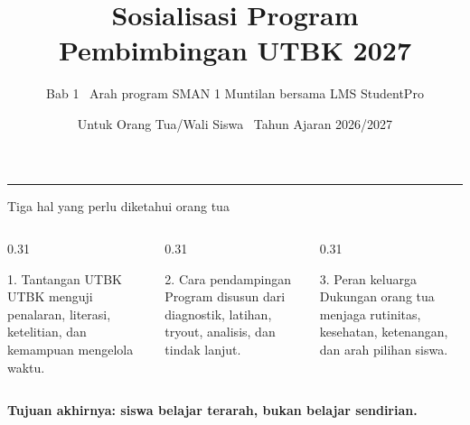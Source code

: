 \renewcommand{\currentchapter}{1}
\title{Sosialisasi Program\\Pembimbingan UTBK 2027}
\subtitle{Bab 1 \textbar\ Arah program SMAN 1 Muntilan bersama LMS StudentPro}
\date{Untuk Orang Tua/Wali Siswa \textbar\ Tahun Ajaran 2026/2027}

\begingroup
{}
\begin{frame}[plain]
  \vspace{0.65cm}
  \vspace{0.08cm}
  {\color{StudentWhite}\inserttitle\par}
  \vspace{0.38cm}
  {\color{StudentSoft}\insertsubtitle\par}
  \vfill
  {\color{StudentGold}\rule{2.3cm}{2.5pt}}\par
  \vspace{0.20cm}
  {\color{StudentWhite}\insertauthor}\par
  {\color{StudentSoft}\insertdate}
  \vspace{0.42cm}
\end{frame}
\endgroup

\begin{frame}{Tiga hal yang perlu diketahui orang tua}
  \vspace{0.05cm}
  \begin{columns}[T,onlytextwidth]
    \begin{column}{0.31\textwidth}
      \begin{block}{1. Tantangan UTBK}
        UTBK menguji penalaran, literasi, ketelitian, dan kemampuan mengelola waktu.
      \end{block}
    \end{column}
    \begin{column}{0.31\textwidth}
      \begin{block}{2. Cara pendampingan}
        Program disusun dari diagnostik, latihan, tryout, analisis, dan tindak lanjut.
      \end{block}
    \end{column}
    \begin{column}{0.31\textwidth}
      \begin{block}{3. Peran keluarga}
        Dukungan orang tua menjaga rutinitas, kesehatan, ketenangan, dan arah pilihan siswa.
      \end{block}
    \end{column}
  \end{columns}
  \vspace{0.30cm}
  \centering
  {\color{StudentNavy}\bfseries\fontsize{15}{18}\selectfont Tujuan akhirnya: siswa belajar terarah, bukan belajar sendirian.}
\end{frame}

